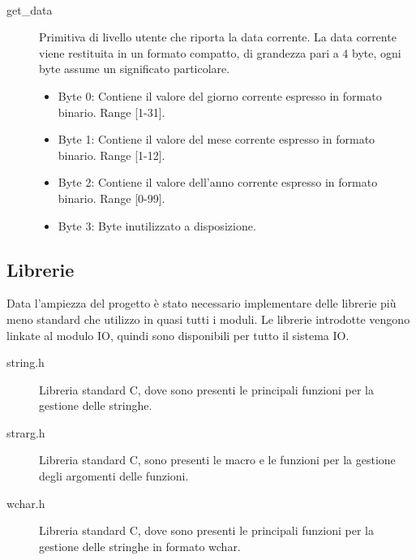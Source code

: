   \ \begin{description}
  \item[get\_data]
    Primitiva di livello utente che riporta la data corrente. La data corrente viene restituita in un formato compatto, di grandezza pari a 4 byte, ogni byte assume un significato particolare. 
    \begin{itemize}
     \item Byte 0: Contiene il valore del giorno corrente espresso in formato binario. Range [1-31].   
    \end{itemize}
    \begin{itemize}
     \item Byte 1: Contiene il valore del mese corrente  espresso in formato binario. Range [1-12].
    \end{itemize}
    \begin{itemize}
     \item Byte 2: Contiene il valore dell'anno corrente espresso in formato binario. Range [0-99].
    \end{itemize}
    \begin{itemize}
     \item Byte 3: Byte inutilizzato a disposizione.
    \end{itemize}
  \end{description}
 
\subsection {Librerie}
 \label{lib}
  Data l'ampiezza del progetto è stato necessario implementare delle librerie più meno standard che utilizzo in quasi tutti i moduli. 
  Le librerie introdotte vengono linkate al modulo IO, quindi sono disponibili per tutto il sistema IO.
  
  \begin{description}
    \item[string.h]
    Libreria standard C, dove sono presenti le principali funzioni per la gestione delle stringhe.
  \end{description}
  
  
  \begin{description}
    \item[strarg.h]
    Libreria standard C, sono presenti le macro e le funzioni per la gestione degli argomenti delle funzioni.
  \end{description}
  
  
  \begin{description}
    \item[wchar.h]
    Libreria standard C, dove sono presenti le principali funzioni per la gestione delle stringhe in formato wchar.
  \end{description}
  
